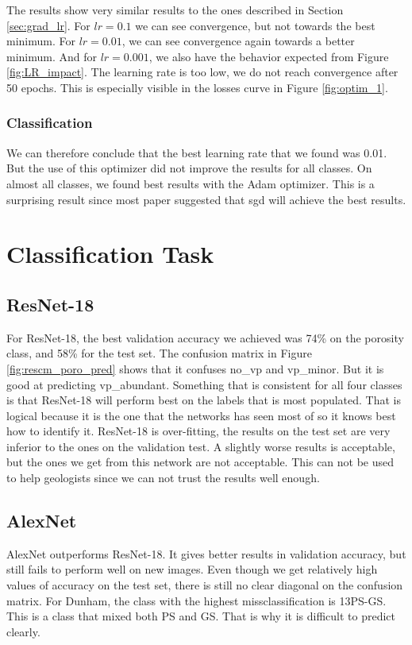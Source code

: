The results show very similar results to the ones described in Section \ref{sec:grad_lr}. For \(lr=0.1\) we can see convergence, but not towards the best minimum. For \(lr=0.01\), we can see convergence again towards a better minimum. And for \(lr=0.001\), we also have the behavior expected from Figure \ref{fig:LR_impact}. The learning rate is too low, we do not reach convergence after 50 epochs. This is especially visible in the losses curve in Figure \ref{fig:optim_1}. 

\subsubsection{Classification}
We can therefore conclude that the best learning rate that we found was 0.01.
But the use of this optimizer did not improve the results for all classes. On almost all classes, we found best results with the Adam optimizer. This is a surprising result since most paper suggested that \gls{sgd} will achieve the best results. 

\section{Classification Task}
\subsection{ResNet-18}
For ResNet-18, the best validation accuracy we achieved was 74\% on the porosity class, and 58\% for the test set. The confusion matrix in Figure \ref{fig:rescm_poro_pred} shows that it confuses no\_vp and vp\_minor. But it is good at predicting vp\_abundant. Something that is consistent for all four classes is that ResNet-18 will perform best on the labels that is most populated. That is logical because it is the one that the networks has seen most of so it knows best how to identify it. ResNet-18 is over-fitting, the results on the test set are very inferior to the ones on the validation test. A slightly worse results is acceptable, but the ones we get from this network are not acceptable. This can not be used to help geologists since we can not trust the results well enough.

\subsection{AlexNet}
AlexNet outperforms ResNet-18. It gives better results in validation accuracy, but still fails to perform well on new images. Even though we get relatively high values of accuracy on the test set, there is still no clear diagonal on the confusion matrix. For Dunham, the class with the highest missclassification is 13PS-GS. This is a class that mixed both PS and GS. That is why it is difficult to predict clearly. 

